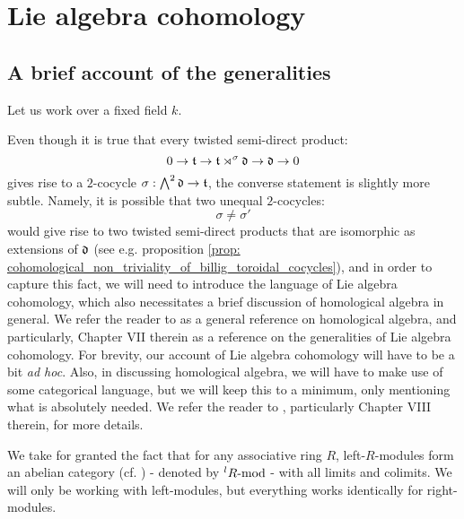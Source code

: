 \section{Lie algebra cohomology} \label{section: lie_algebra_cohomology_appendix}
    \subsection{A brief account of the generalities}
        Let us work over a fixed field $k$.
    
        Even though it is true that every twisted semi-direct product:
            $$0 \to \t \to \t \rtimes^{\sigma} \d \to \d \to 0$$
        gives rise to a $2$-cocycle $\sigma: \bigwedge^2 \d \to \t$, the converse statement is slightly more subtle. Namely, it is possible that two unequal $2$-cocycles:
            $$\sigma \not = \sigma'$$
        would give rise to two twisted semi-direct products that are isomorphic as extensions of $\d$ (see e.g. proposition \ref{prop: cohomological_non_triviality_of_billig_toroidal_cocycles}), and in order to capture this fact, we will need to introduce the language of Lie algebra cohomology, which also necessitates a brief discussion of homological algebra in general. We refer the reader to \cite{hilton_stammbach_homological_algebra} as a general reference on homological algebra, and particularly, Chapter VII therein as a reference on the generalities of Lie algebra cohomology. For brevity, our account of Lie algebra cohomology will have to be a bit \textit{ad hoc}. Also, in discussing homological algebra, we will have to make use of some categorical language, but we will keep this to a minimum, only mentioning what is absolutely needed. We refer the reader to \cite{maclane}, particularly Chapter VIII therein, for more details.
        
        We take for granted the fact that for any associative ring $R$, left-$R$-modules form an abelian category (cf. \cite[Section VIII.3, p. 198]{maclane}) - denoted by ${}^lR\mod$ - with all limits and colimits. We will only be working with left-modules, but everything works identically for right-modules.

